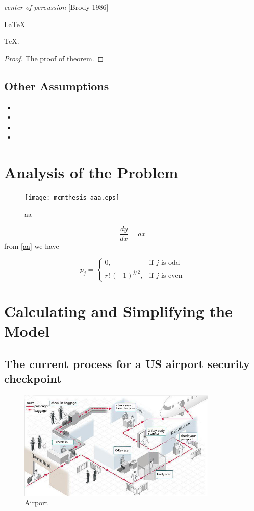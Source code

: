 \documentclass{mcmthesis}
\begin{document}
\emph{center of percussion} [Brody 1986]

\begin{Theorem} \label{thm:latex}
\LaTeX
\end{Theorem}
\begin{Lemma} \label{thm:tex}
\TeX .
\end{Lemma}
\begin{proof}
The proof of theorem.
\end{proof}

\subsection{Other Assumptions}%

\begin{itemize}
\item
\item
\item
\item
\end{itemize}



\section{Analysis of the Problem}%
\begin{figure}[h]
\small
\centering
\texttt{[image: mcmthesis-aaa.eps]}
\caption{aa} \label{fig:aa}
\end{figure}


\begin{equation}
\frac{dy}{dx}=ax \label{aa}
\end{equation}
from \eqref{aa} we have

\[
  p_{j}=\begin{cases} 0,&\text{if $j$ is odd}\\
  r!\,(-1)^{j/2},&\text{if $j$ is even}
  \end{cases}
\]


\section{Calculating and Simplifying the Model}%
\subsection{The current process for a US airport security checkpoint}
\begin{figure}[htbp]
  \centering
  \includegraphics[width=0.85\textwidth]{airport.jpg}
  \caption{Airport}\label{fig:digit}
\end{figure}
\end{document}

